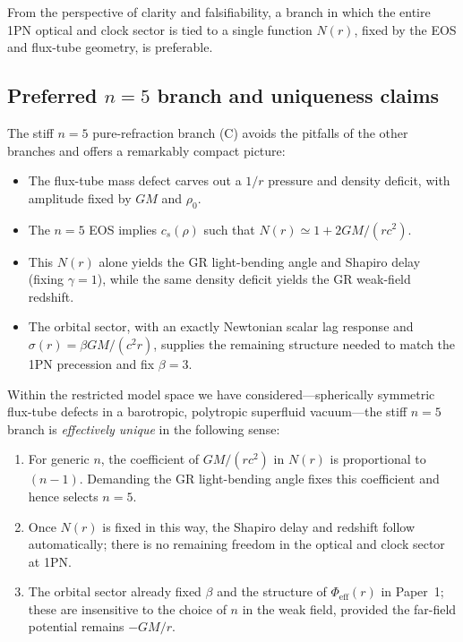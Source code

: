 \documentclass[11pt]{article}
\begin{document}
From the perspective of clarity and falsifiability, a branch in which the
entire 1PN optical and clock sector is tied to a single function $N(r)$,
fixed by the EOS and flux-tube geometry, is preferable.


\subsection{Preferred \texorpdfstring{$n=5$}{n=5} branch and uniqueness claims}
\label{subsec:degeneracies-n5}

The stiff $n=5$ pure-refraction branch (C) avoids the pitfalls of the
other branches and offers a remarkably compact picture:

\begin{itemize}
  \item The flux-tube mass defect carves out a $1/r$ pressure and density
        deficit, with amplitude fixed by $GM$ and $\rho_0$.
  \item The $n=5$ EOS implies $c_s(\rho)$ such that
        $N(r) \simeq 1 + 2GM/(r c^2)$.
  \item This $N(r)$ alone yields the GR light-bending angle and Shapiro
        delay (fixing $\gamma=1$), while the same density deficit yields
        the GR weak-field redshift.
  \item The orbital sector, with an exactly Newtonian scalar lag response and
        $\sigma(r) = \beta GM/(c^2 r)$, supplies the remaining structure
        needed to match the 1PN precession and fix $\beta=3$.
\end{itemize}

Within the restricted model space we have considered---spherically symmetric
flux-tube defects in a barotropic, polytropic superfluid vacuum---the stiff
$n=5$ branch is \emph{effectively unique} in the following sense:

\begin{enumerate}
  \item For generic $n$, the coefficient of $GM/(r c^2)$ in $N(r)$ is
        proportional to $(n-1)$.
        Demanding the GR light-bending angle fixes this coefficient and
        hence selects $n=5$.
  \item Once $N(r)$ is fixed in this way, the Shapiro delay and redshift
        follow automatically; there is no remaining freedom in the optical
        and clock sector at 1PN.
  \item The orbital sector already fixed $\beta$ and the structure of
        $\Phi_{\mathrm{eff}}(r)$ in Paper~1; these are insensitive to the
        choice of $n$ in the weak field, provided the far-field potential
        remains $-GM/r$.
\end{enumerate}
\end{document}
